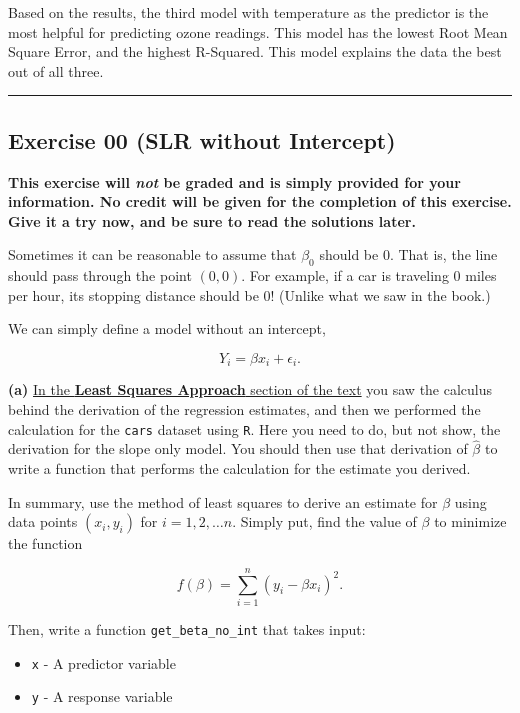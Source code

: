 \documentclass[]{article}
\providecommand{\tightlist}{%
  \setlength{\itemsep}{0pt}\setlength{\parskip}{0pt}}
\begin{document}
Based on the results, the third model with temperature as the predictor
is the most helpful for predicting ozone readings. This model has the
lowest Root Mean Square Error, and the highest R-Squared. This model
explains the data the best out of all three.

\begin{center}\rule{0.5\linewidth}{\linethickness}\end{center}

\subsection{Exercise 00 (SLR without
Intercept)}\label{exercise-00-slr-without-intercept}

\textbf{This exercise will \emph{not} be graded and is simply provided
for your information. No credit will be given for the completion of this
exercise. Give it a try now, and be sure to read the solutions later.}

Sometimes it can be reasonable to assume that \(\beta_0\) should be 0.
That is, the line should pass through the point \((0, 0)\). For example,
if a car is traveling 0 miles per hour, its stopping distance should be
0! (Unlike what we saw in the book.)

We can simply define a model without an intercept,

\[
Y_i = \beta x_i + \epsilon_i.
\]

\textbf{(a)}
\href{http://daviddalpiaz.github.io/appliedstats/simple-linear-regression.html\#least-squares-approach}{In
the \textbf{Least Squares Approach} section of the text} you saw the
calculus behind the derivation of the regression estimates, and then we
performed the calculation for the \texttt{cars} dataset using
\texttt{R}. Here you need to do, but not show, the derivation for the
slope only model. You should then use that derivation of \(\hat{\beta}\)
to write a function that performs the calculation for the estimate you
derived.

In summary, use the method of least squares to derive an estimate for
\(\beta\) using data points \((x_i, y_i)\) for \(i = 1, 2, \ldots n\).
Simply put, find the value of \(\beta\) to minimize the function

\[
f(\beta)=\sum_{i=1}^{n}(y_{i}-\beta x_{i})^{2}.
\]

Then, write a function \texttt{get\_beta\_no\_int} that takes input:

\begin{itemize}
\tightlist
\item
  \texttt{x} - A predictor variable
\item
  \texttt{y} - A response variable
\end{itemize}
\end{document}
